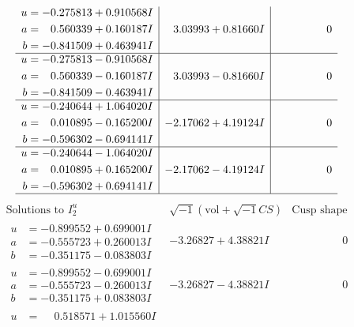 \documentclass[1p]{elsarticle_modified}
\theoremstyle{definition}
\newcommand{\I}{\sqrt{-1}}
\begin{document}
$$\begin{array}{c|c|c}
\begin{aligned}
u &= -0.275813 + 0.910568 I \\
a &= \phantom{-}0.560339 + 0.160187 I \\
b &= -0.841509 + 0.463941 I\end{aligned}
 & \phantom{-}3.03993 + 0.81660 I & \phantom{-0.000000 } 0 \\ \hline\begin{aligned}
u &= -0.275813 - 0.910568 I \\
a &= \phantom{-}0.560339 - 0.160187 I \\
b &= -0.841509 - 0.463941 I\end{aligned}
 & \phantom{-}3.03993 - 0.81660 I & \phantom{-0.000000 } 0 \\ \hline\begin{aligned}
u &= -0.240644 + 1.064020 I \\
a &= \phantom{-}0.010895 - 0.165200 I \\
b &= -0.596302 - 0.694141 I\end{aligned}
 & -2.17062 + 4.19124 I & \phantom{-0.000000 } 0 \\ \hline\begin{aligned}
u &= -0.240644 - 1.064020 I \\
a &= \phantom{-}0.010895 + 0.165200 I \\
b &= -0.596302 + 0.694141 I\end{aligned}
 & -2.17062 - 4.19124 I & \phantom{-0.000000 } 0\\
 \hline 
 \end{array}$$\newpage$$\begin{array}{c|c|c}  
\text{Solutions to }I^u_{2}& \I (\text{vol} + \sqrt{-1}CS) & \text{Cusp shape}\\
 \hline 
\begin{aligned}
u &= -0.899552 + 0.699001 I \\
a &= -0.555723 + 0.260013 I \\
b &= -0.351175 - 0.083803 I\end{aligned}
 & -3.26827 + 4.38821 I & \phantom{-0.000000 } 0 \\ \hline\begin{aligned}
u &= -0.899552 - 0.699001 I \\
a &= -0.555723 - 0.260013 I \\
b &= -0.351175 + 0.083803 I\end{aligned}
 & -3.26827 - 4.38821 I & \phantom{-0.000000 } 0 \\ \hline\begin{aligned}
u &= \phantom{-}0.518571 + 1.015560 I \\

\end{aligned}
\end{array}$$
\end{document}
